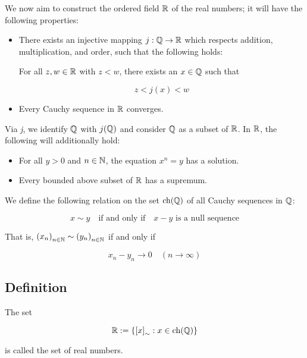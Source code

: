 We now aim to construct the ordered field \( \mathbb{R} \) of the real numbers;
it will have the following properties:

\begin{itemize}
	
	\item There exists an injective mapping \( j : \mathbb{Q} \to \mathbb{R} \) which respects addition, 
    	  multiplication, and order, such that the following holds:
		
		For all \( z, w \in \mathbb{R} \) with \( z < w \), there exists an \( x \in \mathbb{Q} \) such that
		
		\[
			z < j(x) < w
		\]

	\item Every Cauchy sequence in \( \mathbb{R} \) converges.

\end{itemize}

Via \emph{j}, we identify \( \mathbb{Q} \) with \( j(\mathbb{Q}) \) and consider \( \mathbb{Q} \) as a 
subset of \( \mathbb{R} \). In \( \mathbb{R} \), the following will additionally hold:

\begin{itemize}

	\item For all \( y > 0 \) and \( n \in \mathbb{N} \), the equation \( x^n = y \) has a solution.

	\item Every bounded above subset of \( \mathbb{R} \) has a supremum.

\end{itemize}

We define the following relation on the set \( \operatorname{ch}(\mathbb{Q}) \) of all Cauchy sequences 
in \( \mathbb{Q} \):

\[
	x \sim y \quad \text{if and only if} \quad x - y \text{ is a null sequence}
\]

That is, \( {(x_n)}_{n \in \mathbb{N}} \sim {(y_n)}_{n \in \mathbb{N}} \) if and only if

\[
	x_n - y_n \to 0 \quad (n \to \infty)
\]

\subsection{Definition}

The set

\[
	\mathbb{R} := \{ {[x]}_{\sim} : x \in \operatorname{ch}(\mathbb{Q}) \}
\]

is called the set of real numbers.

